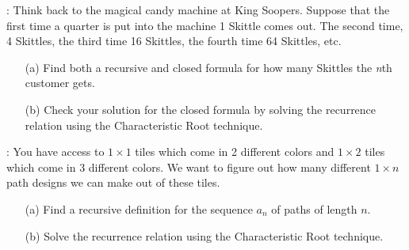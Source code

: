 \documentclass[11pt]{exam}
\begin{document}

\begin{questions}


: Think back to the magical candy machine at King Soopers. Suppose that the first time a quarter is put into the machine 1 Skittle comes out. The second time, 4 Skittles, the third time 16 Skittles, the fourth time 64 Skittles, etc.
\begin{itemize}
\item[(a)] Find both a recursive and closed formula for how many Skittles the \emph{n}th customer gets.
\vfill
\item[(b)] Check your solution for the closed formula by solving the recurrence relation using the Characteristic Root technique.
\end{itemize}
\vfill
\newpage
{}: You have access to $1 \times 1$ tiles which come in 2 different colors and $1\times 2$ tiles which come in 3 different colors.  We want to figure out how many different $1 \times n$ path designs we can make out of these tiles.
\begin{itemize}
\item[(a)] Find a recursive definition for the sequence $a_n$ of paths of length $n$.  
\vfill
\vfill
\item[(b)] Solve the recurrence relation using the Characteristic Root technique.
\end{itemize}


\vfill
\end{questions}
\end{document}

